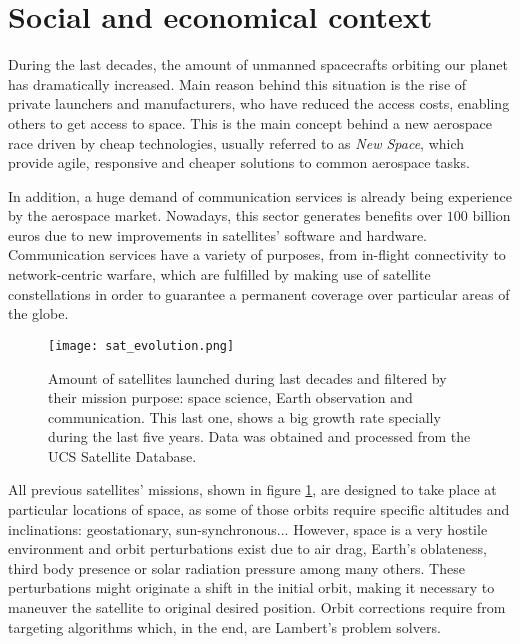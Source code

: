 \section{Social and economical context}

During the last decades, the amount of unmanned spacecrafts orbiting our planet
has dramatically increased. Main reason behind this situation is the rise of
private launchers and manufacturers, who have reduced the access costs, enabling
others to get access to space. This is the main concept behind a new aerospace
race driven by cheap technologies, usually referred to as \textit{New Space},
which provide agile, responsive and cheaper solutions to common aerospace tasks.

In addition, a huge demand of communication services is already being experience
by the aerospace market.  Nowadays, this sector generates benefits over $100$
billion euros due to new improvements in satellites' software and hardware.
Communication services have a variety of purposes, from in-flight connectivity
to network-centric warfare, which are fulfilled by making use of satellite
constellations in order to guarantee a permanent coverage over particular areas
of the globe.


\begin{figure}[h]
  \centering
  \texttt{[image: sat\_evolution.png]}
  \caption{Amount of satellites launched during last decades and filtered by their
    mission purpose: space science, Earth observation and communication. This
    last one, shows a big growth rate specially during the last five years. Data
    was obtained and processed from the UCS Satellite Database.}
  \label{fig:sat_evolution}
\end{figure}

All previous satellites' missions, shown in figure \ref{fig:sat_evolution}, are
designed to take place at particular locations of space, as some of those orbits
require specific altitudes and inclinations: geostationary, sun-synchronous...
However, space is a very hostile environment and orbit perturbations exist due
to air drag, Earth's oblateness, third body presence or solar radiation pressure
among many others. These perturbations might originate a shift in the initial
orbit, making it necessary to maneuver the satellite to original desired
position. Orbit corrections require from targeting algorithms which, in the end,
are Lambert's problem solvers.

